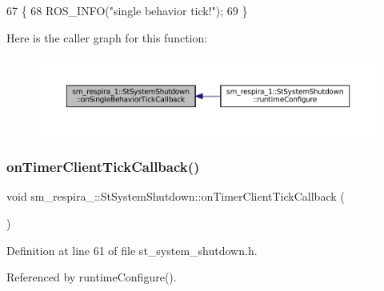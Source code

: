 \begin{DoxyCode}
67     \{
68         ROS\_INFO(\textcolor{stringliteral}{"single behavior tick!"});
69     \}
\end{DoxyCode}
Here is the caller graph for this function\+:
\nopagebreak
\begin{figure}[H]
\begin{center}
\leavevmode
\includegraphics[width=350pt]{structsm__respira__1_1_1StSystemShutdown_af0466e4c8c2527eeb76888d8dfec396c_icgraph}
\end{center}
\end{figure}
\mbox{\label{structsm__respira__1_1_1StSystemShutdown_a4c113d1875fb5a538c45973b87900ff6}} 
\subsubsection{\texorpdfstring{on\+Timer\+Client\+Tick\+Callback()}{onTimerClientTickCallback()}}
{\footnotesize\ttfamily void sm\+\_\+respira\+\_\+::\+St\+System\+Shutdown\+::on\+Timer\+Client\+Tick\+Callback (\begin{DoxyParamCaption}{ }\end{DoxyParamCaption})\hspace{0.3cm}{\ttfamily [inline]}}



Definition at line 61 of file st\+\_\+system\+\_\+shutdown.\+h.



Referenced by runtime\+Configure().


